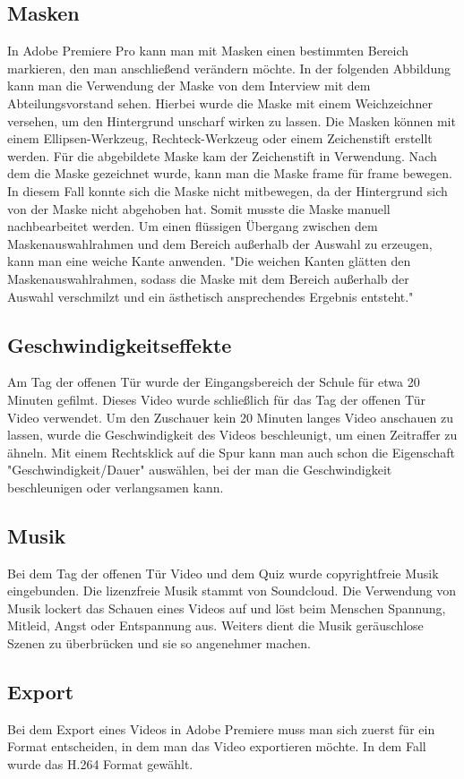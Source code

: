 \subsection{Masken}
In Adobe Premiere Pro kann man mit Masken einen bestimmten Bereich markieren, den man anschließend verändern möchte. In der folgenden Abbildung kann man die Verwendung der Maske von dem Interview mit dem Abteilungsvorstand sehen. 
Hierbei wurde die Maske mit einem Weichzeichner versehen, um den Hintergrund unscharf wirken zu lassen. Die Masken können mit einem Ellipsen-Werkzeug, Rechteck-Werkzeug oder einem Zeichenstift erstellt werden. Für die abgebildete Maske kam der Zeichenstift in Verwendung. Nach dem die Maske gezeichnet wurde, kann man die Maske frame für frame bewegen. In diesem Fall konnte sich die Maske nicht mitbewegen, da der Hintergrund sich von der Maske nicht abgehoben hat. Somit musste die Maske manuell nachbearbeitet werden.\newline
Um einen flüssigen Übergang zwischen dem Maskenauswahlrahmen und dem Bereich außerhalb der Auswahl zu erzeugen, kann man eine weiche Kante anwenden. "Die weichen Kanten glätten den Maskenauswahlrahmen, sodass die Maske mit dem Bereich außerhalb der Auswahl verschmilzt und ein ästhetisch ansprechendes Ergebnis entsteht." 
\subsection{Geschwindigkeitseffekte}
Am Tag der offenen Tür wurde der Eingangsbereich der Schule für etwa 20 Minuten gefilmt. Dieses Video wurde schließlich für das Tag der offenen Tür Video verwendet. Um den Zuschauer kein 20 Minuten langes Video anschauen zu lassen, wurde die Geschwindigkeit des Videos beschleunigt, um einen Zeitraffer zu ähneln. Mit einem Rechtsklick auf die Spur kann man auch schon die Eigenschaft "Geschwindigkeit/Dauer" auswählen, bei der man die Geschwindigkeit beschleunigen oder verlangsamen kann. 
\subsection{Musik}
Bei dem Tag der offenen Tür Video und dem Quiz wurde copyrightfreie Musik eingebunden. Die lizenzfreie Musik stammt von Soundcloud. Die Verwendung von Musik lockert das Schauen eines Videos auf und löst beim Menschen Spannung, Mitleid, Angst oder Entspannung aus. Weiters dient die Musik geräuschlose Szenen zu überbrücken und sie so angenehmer machen. 
\subsection{Export}
Bei dem Export eines Videos in Adobe Premiere muss man sich zuerst für ein Format entscheiden, in dem man das Video exportieren möchte. In dem Fall wurde das H.264 Format gewählt. 